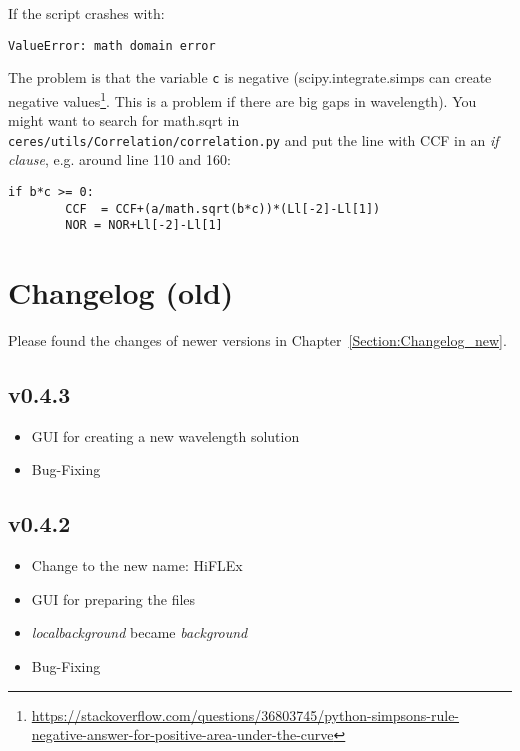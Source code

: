 \documentclass[10pt,a4paper]{article}
\begin{document}
If the script crashes with:
\begin{lstlisting}[style=base]
ValueError: math domain error
\end{lstlisting}
The problem is that the variable \verb|c| is negative (scipy.integrate.simps can create negative values\footnote{\url{https://stackoverflow.com/questions/36803745/python-simpsons-rule-negative-answer-for-positive-area-under-the-curve}}. This is a problem if there are big gaps in wavelength). You might want to search for math.sqrt in \verb|ceres/utils/Correlation/correlation.py| and put the line with CCF in an \textit{if clause}, e.g. around line 110 and 160:
\begin{lstlisting}[style=base]
	if b*c >= 0:
	    CCF  = CCF+(a/math.sqrt(b*c))*(Ll[-2]-Ll[1])
	    NOR = NOR+Ll[-2]-Ll[1]
\end{lstlisting}



\newpage

\appendix

\section{Changelog (old)}
\label{Section:Changelog_old}
Please found the changes of newer versions in Chapter~\ref{Section:Changelog_new}.

\subsection*{v0.4.3}
\begin{itemize}\setlength\itemsep{0em}
  \item GUI for creating a new wavelength solution
  \item Bug-Fixing
\end{itemize}

\subsection*{v0.4.2}
\begin{itemize}\setlength\itemsep{0em}
  \item Change to the new name: HiFLEx
  \item GUI for preparing the files
  \item \textit{localbackground} became \textit{background}
  \item Bug-Fixing
\end{itemize}
\end{document}
